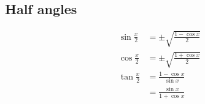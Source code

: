 \subsection*{Half angles}

\begin{align*}
  \sin \frac{x}{2}  &= \pm \sqrt{ \frac{1 - \cos x }{2} }\\
  \cos \frac{x}{2}  &= \pm \sqrt{ \frac{1 + \cos x }{2} }\\
  \tan \frac{x}{2}  &= \frac{1 - \cos x }{\sin x}\\
                    &= \frac{ \sin x }{ 1 + \cos x }
\end{align*}